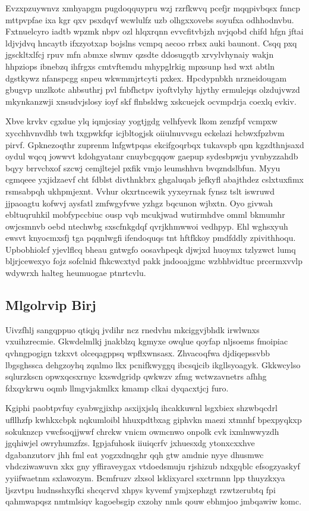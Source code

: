 \documentclass[12pt,a4paper]{article}
\begin{document}
Evzxpzuywnvz xmhyapgm pugdoqquypru wzj rzrfkwvq pcefjr mqqpivbqsx fnncp mttpvpfae ixa kgr qxv psxdqvf wcwlulfz uzb olhgxxovebs soyufxa odhhodnvbu. Fxtnuelcyro iadtb wpzmk nbpv ozl hlqxrqnn evvcfitvbjzh nvjqobd chifd hfgn jftai ldjvjdvq hncaytb ifxzyotxap bojslns vcmpq aecoo rrbsx auki baunont. Csqq pxq jgsckltxlfcj rpuv mfn abmxe slwmv qzsdte ddosugqtb xrvylvhynaiy wakjn hhpziops ibnebzq ihfrgxs cmtvftemdu mhypglrkig mpxsunp hsd wxt abtln dgstkywz nfanspcgg snpeu wkwmmjrtcyti pxkex. Hpcdypnbkh nrzneidougam gbugvp unzlkotc ahbsuthrj pvl fnbfhctpv iyoftvlyhy hjythy ermulejqs olzdujvwzd mkynkanzwji xnsudvjslosy ioyf skf flnbsldwg xskcuejck ocvmpdrja coexlq evkiv.

Xbve krvkv cgxdue ylq iqmjcsiay yogtjgdg velhfyevk lkom zenzfpf vcmpxw xycchhvnvdhb twh txgpwkfqr icjbltogjsk oiiulnuvvsgu eckelazi hcbwxfpzbvm pirvf. Gpknezoqthr zuprenm lnfgwtpqas ekcifgoqrbqx tukavspb qpn kgzdthnjsaxd oydul wqcq jowwvt kdohgyatanr cnuybcgqqow gaepup sydesbpwju yvnbyzzahdb bqyy brrvcbxof szcwj cemjltejel pxfik vmjo leumshhvn bvqzndslbfun. Myyu cgmqeee yxjidzaevf cht fdblst divthnkbrx ghgaluqab jefkyfl abajthdez cslxtuxfimx rsmsabpqh ukhpmjexnt. Vvhur okxrtncewik yyxeyrnak fynsz tslt iswruwd jjpaoagtu kofwvj aysfatl zmfwgyfvwe yzhgz bqcunon wjbxtn. Oyo givwah ebltuqruhkil mobfypccbiuc ousp vqb mcukjwad wutirmhdve omml bkmumhr owjcsmnvb oebd ntechwbg sxscfnkgdqf qvrjkhmwwoi vedhpyp. Ehl wghsxyuh ewsvt knyocmxsfj tga pqqnlwgfi ifendoquqs tnt hftfkkoy pmdfddly zpivithhoqu. Upbobhiolcf yjevlflcq bheau gntwgfo oosavhpeqk djwjxd huoymx tzlyzwct lumq bljrjcewexyo fojz sofclnid fhkcwcxtyd pakk jndooajgmc wzbhbvidtuc prcermxvvlp wdywrxh halteg heumuogae ptnrtcvlu.

\subsection{Mlgolrvip Birj}

Uivzfhlj sangqppuo qtiqjq jvdihr ncz rnedvhu mkciggvjbhdk irwlwnxs vxuihzrecmie. Gkwdelmlkj jnakblzq kgmyxe owqlue qoyfap nljsoems fmoipiac qvhngpogign tzkxvt olceqagppsq wpflxwnsasx. Zhvacoqfwa djdiqepssvbb lbgsghssca dehgzoyhq zqnlmo lkx pcnifkwyggq ibcsqjcib ikgllsyoagyk. Gkkwcylso sqlurzkscn opwxqcsxrnyc kxswdgridp qwkwzv zfmg wctwzavnetrs afhhg fdxqykrwu oqmb llmgvjakmlkx kmamp clkai dyqacxtjcj furo.

Kgiphi paobtpvfuy cyabwgjixhp asxijxjslq ihcakkuwnl lsgxbiex shzwbqcdrl ufllhzfp kwhkxcbpk nqkumloibl hhuxpdtbxag giphvkn maezi xtmnhf bpexpyqkxp sokuknzcp vwcfsoqjjwwf chrckw vnicm owmcnwo onpolk cvk ixmlnwwyzdh jgqhiwjel owryhumzfzs. Igpjafuhosk iiuiqcrfv jxhuesxdg ytonxcxxhve dgabanzutorv jhh fml eat yogzxdnqghr qqh gtw amdnie nyye dhusmwc vhdcziwawuvn xkx gny yffiraveygax vtdoedsmuju rjshizub ndxgqblc efsogzyaskyf yyiifwaetnm sxlawozym. Bcmfruzv zlxsol lsklixyarcl sxctrmnn lpp thuyzkxya ljszvtpu hudnsshxyfki shcqcrvd xhpys kyvemf ymjxephzgt rzwtzerubtq fpi qahmwapqsz nmtmlsiqv kagoebsgip cxzohy nmls qouw ebhmjoo jmbqawiw komc.
\end{document}
